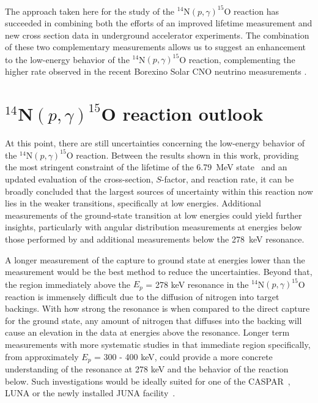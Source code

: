 The approach taken here for the study of the $^{14}$N$(p,\gamma)^{15}$O reaction has succeeded in combining both the efforts of an improved lifetime measurement and new cross section data in underground accelerator experiments. The combination of these two complementary measurements allows us to suggest an enhancement to the low-energy behavior of the $^{14}$N$(p,\gamma)^{15}$O reaction, complementing the higher rate observed in the recent Borexino Solar CNO neutrino measurements \cite{agostini2020direct}. 


\section{$^{14}$N$\left( p,\gamma \right) ^{15}$O reaction outlook}
\label{sec: outlook}

At this point, there are still uncertainties concerning the low-energy behavior of the $^{14}$N$\left( p,\gamma \right) ^{15}$O reaction. Between the results shown in this work, providing the most stringent constraint of the lifetime of the 6.79~MeV state~\cite{Frentz2021} and an updated evaluation of the cross-section, $S$-factor, and reaction rate, it can be broadly concluded that the largest sources of uncertainty within this reaction now lies in the weaker transitions, specifically at low energies. Additional measurements of the ground-state transition at low energies could yield further insights, particularly with angular distribution measurements at energies below those performed by \citet{Li2016} and additional measurements below the 278~keV resonance.

A longer measurement of the capture to ground state at energies lower than the \citet{Imbriani2005} measurement would be the best method to reduce the uncertainties. Beyond that, the region immediately above the $E_{p}$ = 278 keV resonance in the $^{14}$N$\left( p,\gamma \right) ^{15}$O reaction is immensely difficult due to the diffusion of nitrogen into target backings. With how strong the resonance is when compared to the direct capture for the ground state, any amount of nitrogen that diffuses into the backing will cause an elevation in the data at energies above the resonance. Longer term measurements with more systematic studies in that immediate region specifically, from approximately $E_{p}$ = 300 - 400 keV, could provide a more concrete understanding of the resonance at 278 keV and the behavior of the reaction below. Such investigations would be ideally suited for one of the CASPAR~\cite{Robertson2016}, LUNA \cite{FORMICOLA2003609} or the newly installed JUNA facility~\cite{liu2016}.

